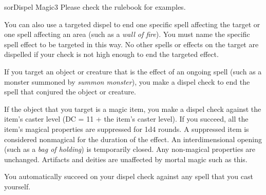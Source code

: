 \begin{spellcard}{sor}{Dispel Magic}{3}
  Please check the rulebook for examples.

  You can also use a targeted dispel to end one specific spell affecting the target or one spell affecting an area
  (such as a \emph{wall of fire}).
  You must name the specific spell effect to be targeted in this way.
  No other spells or effects on the target are dispelled if your check is not high enough to end the targeted effect.

  If you target an object or creature that is the effect of an ongoing spell
  (such as a monster summoned by \emph{summon monster}),
  you make a dispel check to end the spell that conjured the object or creature.

  If the object that you target is a magic item,
  you make a dispel check against the item's caster level (DC = 11 + the item's caster level).
  If you succeed, all the item's magical properties are suppressed for 1d4 rounds.
  A suppressed item is considered nonmagical for the duration of the effect.
  An interdimensional opening (such as a \emph{bag of holding}) is temporarily closed.
  Any non-magical properties are unchanged.
  Artifacts and deities are unaffected by mortal magic such as this.

  You automatically succeed on your dispel check against any spell that you cast yourself.
\end{spellcard}
